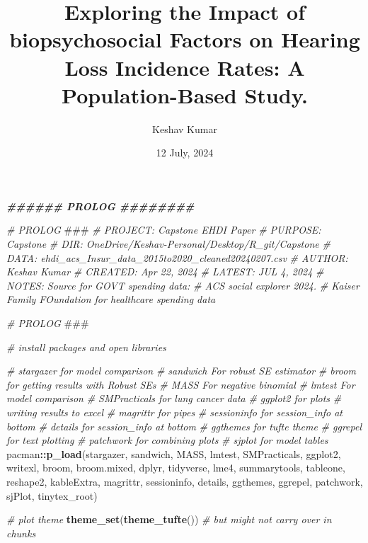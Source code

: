 \documentclass[
]{article}
\title{Exploring the Impact of biopsychosocial Factors on Hearing Loss
Incidence Rates: A Population-Based Study.}
\author{Keshav Kumar}
\date{12 July, 2024}
\newenvironment{Shaded}{\begin{snugshade}}{\end{snugshade}}
\newcommand{\AlertTok}[1]{\textcolor[rgb]{0.94,0.16,0.16}{#1}}
\newcommand{\CommentTok}[1]{\textcolor[rgb]{0.56,0.35,0.01}{\textit{#1}}}
\newcommand{\DocumentationTok}[1]{\textcolor[rgb]{0.56,0.35,0.01}{\textbf{\textit{#1}}}}
\newcommand{\FunctionTok}[1]{\textcolor[rgb]{0.13,0.29,0.53}{\textbf{#1}}}
\newcommand{\NormalTok}[1]{#1}
\newcommand{\SpecialCharTok}[1]{\textcolor[rgb]{0.81,0.36,0.00}{\textbf{#1}}}
\begin{document}
\maketitle

{
\setcounter{tocdepth}{4}
\tableofcontents
}
\begin{Shaded}
\begin{Highlighting}[]
\DocumentationTok{\#\#\#\#\#\# PROLOG \#\#\#\#\#\#\#\#}


\CommentTok{\# PROLOG   }\AlertTok{\#\#\#}
\CommentTok{\# PROJECT: Capstone EHDI Paper                                   }
\CommentTok{\# PURPOSE: Capstone                                      }
\CommentTok{\# DIR:     OneDrive/Keshav{-}Personal/Desktop/R\_git/Capstone                    }
\CommentTok{\# DATA:    ehdi\_acs\_Insur\_data\_2015to2020\_cleaned20240207.csv             }
\CommentTok{\# AUTHOR:  Keshav Kumar                                            }
\CommentTok{\# CREATED: Apr 22, 2024                                           }
\CommentTok{\# LATEST:  JUL 4, 2024                                      }
\CommentTok{\# NOTES:   Source for GOVT spending data: }
\CommentTok{\#          ACS social explorer 2024.}
\CommentTok{\#         Kaiser Family FOundation for healthcare spending data}

\CommentTok{\# PROLOG   }\AlertTok{\#\#\#}\CommentTok{ }


\CommentTok{\# install packages and open libraries}

\CommentTok{\# stargazer for model comparison}
\CommentTok{\# sandwich For robust SE estimator}
\CommentTok{\# broom for getting results with Robust SEs}
\CommentTok{\# MASS For negative binomial}
\CommentTok{\# lmtest For model comparison}
\CommentTok{\# SMPracticals for lung cancer data}
\CommentTok{\# ggplot2 for plots}
\CommentTok{\# writing results to excel}
\CommentTok{\# magrittr for pipes}
\CommentTok{\# sessioninfo for session\_info at bottom}
\CommentTok{\# details for session\_info at bottom}
\CommentTok{\# ggthemes for tufte theme}
\CommentTok{\# ggrepel for text plotting}
\CommentTok{\# patchwork for combining plots}
\CommentTok{\# sjplot for model tables}
\NormalTok{pacman}\SpecialCharTok{::}\FunctionTok{p\_load}\NormalTok{(stargazer, sandwich, MASS, lmtest, SMPracticals, ggplot2, writexl, broom, broom.mixed, dplyr, tidyverse, lme4, summarytools, tableone, reshape2, kableExtra, magrittr, sessioninfo, details, ggthemes, ggrepel, patchwork, sjPlot, tinytex\_root)}

\CommentTok{\# plot theme}
\FunctionTok{theme\_set}\NormalTok{(}\FunctionTok{theme\_tufte}\NormalTok{())  }\CommentTok{\# but might not carry over in chunks}


\end{Highlighting}
\end{Shaded}
\end{document}
